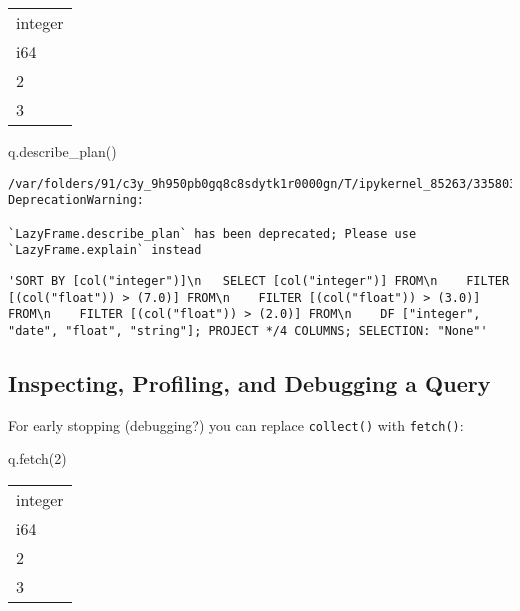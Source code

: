 \documentclass[
  letterpaper,
  DIV=11,
  numbers=noendperiod]{scrartcl}
\newenvironment{Shaded}{\begin{snugshade}}{\end{snugshade}}
\newcommand{\DecValTok}[1]{\textcolor[rgb]{0.68,0.00,0.00}{#1}}
\newcommand{\NormalTok}[1]{\textcolor[rgb]{0.00,0.23,0.31}{#1}}
\begin{document}
\begin{longtable}[]{@{}l@{}}
\toprule()
integer \\
i64 \\
\midrule()
\endhead
2 \\
3 \\
\bottomrule()
\end{longtable}

\begin{Shaded}
\begin{Highlighting}[]
\NormalTok{q.describe\_plan()}
\end{Highlighting}
\end{Shaded}

\begin{verbatim}
/var/folders/91/c3y_9h950pb0gq8c8sdytk1r0000gn/T/ipykernel_85263/3358036380.py:1: DeprecationWarning:

`LazyFrame.describe_plan` has been deprecated; Please use `LazyFrame.explain` instead
\end{verbatim}

\begin{verbatim}
'SORT BY [col("integer")]\n   SELECT [col("integer")] FROM\n    FILTER [(col("float")) > (7.0)] FROM\n    FILTER [(col("float")) > (3.0)] FROM\n    FILTER [(col("float")) > (2.0)] FROM\n    DF ["integer", "date", "float", "string"]; PROJECT */4 COLUMNS; SELECTION: "None"'
\end{verbatim}

\hypertarget{inspecting-profiling-and-debugging-a-query}{%
\subsection{Inspecting, Profiling, and Debugging a
Query}\label{inspecting-profiling-and-debugging-a-query}}

For early stopping (debugging?) you can replace \texttt{collect()} with
\texttt{fetch()}:

\begin{Shaded}
\begin{Highlighting}[]
\NormalTok{q.fetch(}\DecValTok{2}\NormalTok{)}
\end{Highlighting}
\end{Shaded}

\begin{longtable}[]{@{}l@{}}
\toprule()
integer \\
i64 \\
\midrule()
\endhead
2 \\
3 \\
\bottomrule()
\end{longtable}
\end{document}

